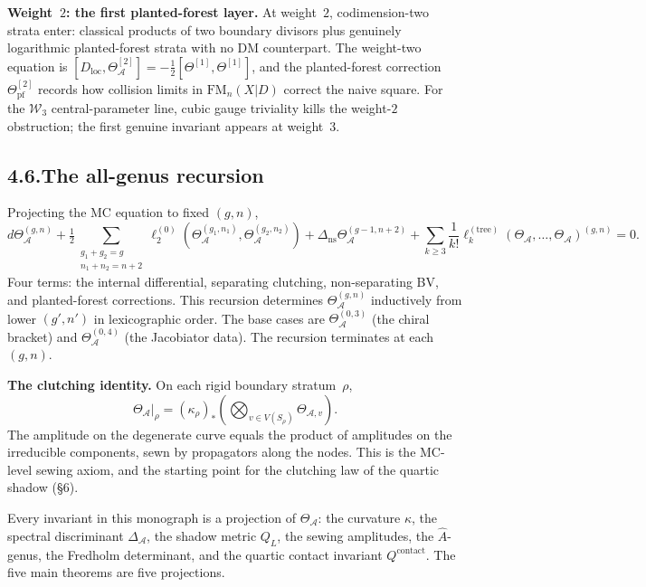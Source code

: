 \documentclass[11pt,reqno]{amsart}
\theoremstyle{definition}
\theoremstyle{remark}
\providecommand{\cA}{\mathcal{A}}
\numberwithin{equation}{section}
\begin{document}
\medskip
\noindent\textbf{Weight~$2$: the first planted-forest layer.}\enspace
At weight~$2$, codimension-two strata enter: classical products of
two boundary divisors plus genuinely logarithmic planted-forest
strata with no DM counterpart. The weight-two equation is
$[D_{\mathrm{loc}},\Theta^{[2]}_\cA]=-\tfrac12[\Theta^{[1]},\Theta^{[1]}]$,
and the planted-forest correction $\Theta^{[2]}_{\mathrm{pf}}$ records
how collision limits in $\mathrm{FM}_n(X|D)$ correct the naive square.
For the $\mathcal W_3$ central-parameter line, cubic gauge triviality
kills the weight-$2$ obstruction; the first genuine invariant appears
at weight~$3$.

\subsection*{4.6.\enspace The all-genus recursion}

Projecting the MC equation to fixed $(g,n)$,
\[
d\Theta^{(g,n)}_\cA+\tfrac12\!\!\!\sum_{\substack{g_1+g_2=g\\n_1+n_2=n+2}}\!\!\!\ell_2^{(0)}(\Theta^{(g_1,n_1)}_\cA,\Theta^{(g_2,n_2)}_\cA)+\Delta_{\mathrm{ns}}\Theta^{(g-1,n+2)}_\cA+\sum_{k\ge 3}\frac{1}{k!}\ell_k^{(\mathrm{tree})}(\Theta_\cA,\ldots,\Theta_\cA)^{(g,n)}=0.
\]
Four terms: the internal differential, separating clutching,
non-separating BV, and planted-forest corrections. This recursion
determines $\Theta^{(g,n)}_\cA$ inductively from lower $(g',n')$ in
lexicographic order. The base cases are
$\Theta^{(0,3)}_\cA$ (the chiral bracket) and $\Theta^{(0,4)}_\cA$
(the Jacobiator data). The recursion terminates at each $(g,n)$.

\medskip
\noindent\textbf{The clutching identity.}\enspace
On each rigid boundary stratum~$\rho$,
\[
\Theta_\cA\big|_\rho=(\kappa_\rho)_*\!\left(\bigotimes_{v\in V(S_\rho)}\Theta_{\cA,v}\right).
\]
The amplitude on the degenerate curve equals the product of amplitudes
on the irreducible components, sewn by propagators along the nodes.
This is the MC-level sewing axiom, and the starting point for the
clutching law of the quartic shadow (\S6).

\bigskip
\noindent
Every invariant in this monograph is a projection of $\Theta_\cA$:
the curvature $\kappa$, the spectral discriminant $\Delta_\cA$, the
shadow metric $Q_L$, the sewing amplitudes, the $\hat A$-genus, the
Fredholm determinant, and the quartic contact invariant
$Q^{\mathrm{contact}}$. The five main theorems are five projections.
\end{document}
